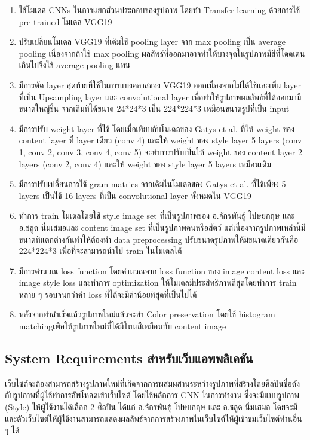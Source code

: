\documentclass[12pt,oneside,openright,a4paper]{cpe-thai-project}
\begin{document}
\begin{enumerate}
  \item ใช้โมเดล CNNs ในการแยกส่วนประกอบของรูปภาพ โดยทำ Transfer learning ด้วยการใช้ pre-trained โมเดล VGG19 
  \item ปรับเปลี่ยนโมเดล VGG19 ที่เดิมใช้ pooling layer จาก max pooling เป็น average pooling เนื่องจากถ้าใช้ max pooling ผลลัพธ์ที่ออกมาอาจทำให้บางจุดในรูปภาพมีสีที่โดดเด่นเกินไปจึงใช้  average pooling แทน
  \item มีการตัด layer สุดท้ายที่ใช้ในการแบ่งคลาสของ VGG19 ออกเนื่องจากไม่ได้ใช้และเพิ่ม layer ที่เป็น Upsampling layer และ convolutional layer เพื่อทำให้รูปภาพผลลัพธ์ที่ได้ออกมามีขนาดใหญ่ขึ้น จากเดิมที่ได้ขนาด 24*24*3 เป็น 224*224*3 เหมือนขนาดรูปที่เป็น input
  \item มีการปรับ weight layer ที่ใช้ โดยเมื่อเทียบกับโมเดลของ Gatys  et al. \cite{gatys2015neural} ที่ให้ weight ของ content layer ที่ layer เดียว (conv 4) และให้ weight ของ style layer 5 layers (conv 1, conv 2, conv 3, conv 4, conv 5) จะทำการปรับเป็นให้ weight ของ content layer 2 layers (conv 2, conv 4) และให้ weight ของ style layer 5 layers เหมือนเดิม 
  \item มีการปรับเปลี่ยนการใช้ gram matrics จากเดิมในโมเดลของ Gatys  et al. \cite{gatys2015neural} ที่ใช้เพียง 5 layers เป็นใช้ 16 layers ที่เป็น convolutional layer ทั้งหมดใน VGG19
  \item ทำการ train โมเดลโดยใช้ style image set ที่เป็นรูปภาพของ อ.จักรพันธุ์ โปษยกฤษ และ อ.ชลูด นิ่มเสมอและ content image set ที่เป็นรูปภาพคนหรือสัตว์ แต่เนื่องจากรูปภาพเหล่านี้มีขนาดที่แตกต่างกันทำให้ต้องทำ data preprocessing ปรับขนาดรูปภาพให้มีขนาดเดียวกันคือ 224*224*3 เพื่อที่จะสามารถนำไป train ในโมเดลได้
  \item มีการคำนวณ loss function โดยคำนวณจาก loss function ของ image content loss และ image style loss และทำการ optimization ให้โมเดลมีประสิทธิภาพดีสุดโดยทำการ train หลาย ๆ รอบจนกว่าค่า loss ที่ได้จะมีค่าน้อยที่สุดที่เป็นไปได้
  \item หลังจากทำสำเร็จแล้วรูปภาพใหม่แล้วจะทำ Color preservation โดยใช้ histogram matchingเพื่อให้รูปภาพใหม่ที่ได้มีโทนสีเหมือนกับ content image
\end{enumerate}

\subsection{System Requirements สำหรับเว็บแอพพลิเคชัน}
\par\setlength{\parindent}{5ex}
เว็บไซต์จะต้องสามารถสร้างรูปภาพใหม่ที่เกิดจากการผสมผสานระหว่างรูปภาพที่สร้างโดยศิลปินชื่อดังกับรูปภาพที่ผู้ใช้ทำการอัพโหลดเข้าเว็บไซต์ โดยใช้หลักการ CNN ในการทำงาน ซึ่งจะมีแบบรูปภาพ (Style) ให้ผู้ใช้งานได้เลือก 2 ศิลปิน ได้แก่ อ.จักรพันธุ์ โปษยกฤษ และ อ.ชลูด นิ่มเสมอ โดยจะมี และตัวเว็บไซต์ให้ผู้ใช้งานสามารถแสดงผลลัพธ์จากการสร้างภาพในเว็บไซต์ให้ผู้เข้าชมเว็บไซต์ท่านอื่น ๆ ได้ 
\end{document}
